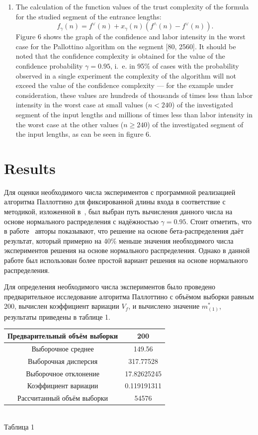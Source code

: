 \documentclass[a4paper]{article}
\begin{document}
\begin{enumerate}
	\item The calculation of the function values of the trust complexity of the formula for the studied segment of the entrance lengths: $$f_\gamma(n) = f^\vee(n) + x_\gamma(n) (f^\wedge(n) - f^\vee(n)).$$ Figure 6 shows the graph of the confidence and labor intensity in the worst case for the Pallottino algorithm on the segment [80, 2560]. It should be noted that the confidence complexity is obtained for the value of the confidence probability $\gamma = 0.95$, i.~e. in 95\% of cases with the probability observed in a single experiment  the complexity of the algorithm will not exceed the value of the confidence complexity --- for the example under consideration, these values are hundreds of thousands of times less than labor intensity in the worst case at small values ($n < 240$) of the investigated segment of the input lengths and millions of times less than labor intensity in the worst case at the other values ($n \geq 240$) of the investigated segment of the input lengths, as can be seen in figure 6.
\end{enumerate}

\section{Results} \label{sec:results}

Для оценки необходимого числа экспериментов с программной реализацией алгоритма Паллоттино для фиксированной длины входа в соответствие с методикой, изложенной в~\cite{petrushyn_ulyanov_planning}, был выбран путь вычисления данного числа на основе нормального распределения с надёжностью $\gamma = 0.95$. Стоит отметить, что в работе~\cite{petrushyn_ulyanov_planning} авторы показывают, что решение на основе бета-распределения даёт результат, который примерно на 40\% меньше значения необходимого числа экспериментов решения на основе нормального распределения. Однако в данной работе был использован более простой вариант решения на основе нормального распределения.

Для определения необходимого числа экспериментов было проведено предварительное исследование алгоритма Паллоттино с объёмом выборки равным 200, вычислен коэффициент вариации $V_f$, и вычислено значение $m_{(1)}^*$, результаты приведены в таблице 1.

\begin{center}
	\label{table1}
\begin{tabular}{|c|c|}
	\hline
	Предварительный объём выборки & 200 \\
	\hline
	Выборочное среднее & 149.56 \\
	\hline
	Выборочная дисперсия & 317.77528 \\
	\hline
	Выборочное отклонение & 17.82625245 \\
	\hline
	Коэффициент вариации & 0.119191311 \\
	\hline
	Рассчитанный объём выборки & 54576 \\
	\hline
\end{tabular} \\
	\hfill \break
	Таблица 1
\end{center}
\end{document}
